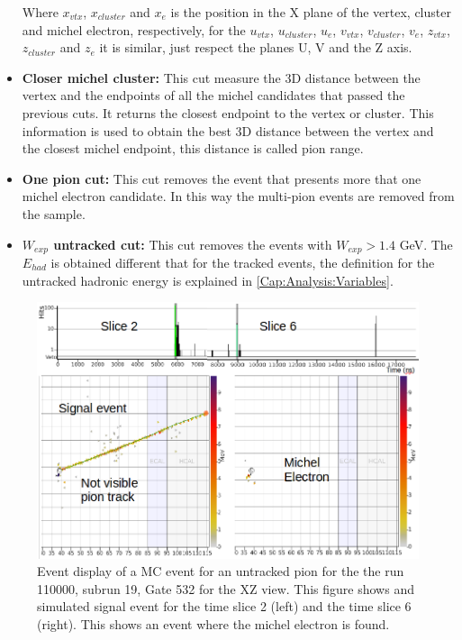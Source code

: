 \begin{itemize}
    Where $x_{vtx}$, $x_{cluster}$ and $x_{e}$ is the position in the X plane of the vertex, cluster and michel electron, respectively, for the $u_{vtx}$, $u_{cluster}$, $u_{e}$, $v_{vtx}$, $v_{cluster}$, $v_{e}$, $z_{vtx}$, $z_{cluster}$ and $z_{e}$ it is similar, just respect the planes U, V and the Z axis.

    
    \item \textbf{Closer michel cluster:} This cut measure the 3D distance between the vertex and the endpoints of all the michel candidates that passed the previous cuts. It returns the closest endpoint to the vertex or cluster. This information is used to obtain the best 3D distance between the vertex and the closest michel endpoint, this distance is called pion range. 
    \item \textbf{One pion cut:} This cut removes the event that presents more that one michel electron candidate. In this way the multi-pion events are removed from the sample.
    \item \textbf{$W_{exp}$ untracked cut:} This cut removes the events with $W_{exp} > 1.4$ GeV. The $E_{had}$ is obtained different that for the tracked events, the definition for the untracked hadronic energy is explained in \ref{Cap:Analysis:Variables}.

\end{itemize}

\begin{figure}[!htb]
    \centering
    \includegraphics[scale=0.4]{Figures/Chapter4/DataSelection/EvenDisplayUntrackedSignalEventRun110000SubRun19Gate532.png}
    \caption{Event display of a MC event for an untracked pion for the the run 110000, subrun 19, Gate 532 for the XZ view. This figure shows and simulated signal event for the time slice 2 (left) and the time slice 6 (right). This shows an event where the michel electron is found. }
    \label{fig:Analysis:DataSelection:Cuts:Tracked:EventDisplayMEUntracked}
\end{figure}

